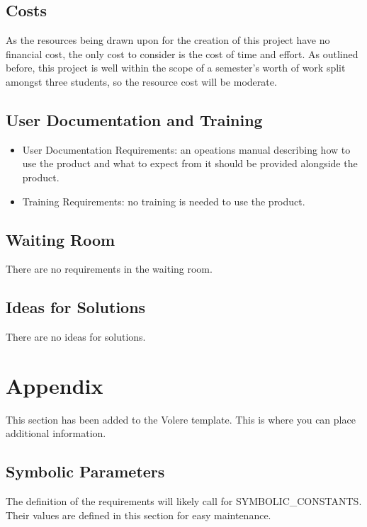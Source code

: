 \documentclass[12pt, titlepage]{article}
\begin{document}
\subsection{Costs}
As the resources being drawn upon for the creation of this project have no financial cost, the only cost to consider is the cost of time and effort. As outlined before, this project is well within the scope of a semester's worth of work split amongst three students, so the resource cost will be moderate.

\subsection{User Documentation and Training}
\begin{itemize}
  \item User Documentation Requirements:  an opeations manual describing how to
  use the product and what to expect from it should be provided alongside the product.
  \item Training Requirements: no training is needed to use the product.
\end{itemize}

\subsection{Waiting Room}
There are no requirements in the waiting room.

\subsection{Ideas for Solutions}
There are no ideas for solutions.





\newpage

\section{Appendix}

This section has been added to the Volere template.  This is where you can place
additional information.

\subsection{Symbolic Parameters}

The definition of the requirements will likely call for SYMBOLIC\_CONSTANTS.
Their values are defined in this section for easy maintenance.
\end{document}
